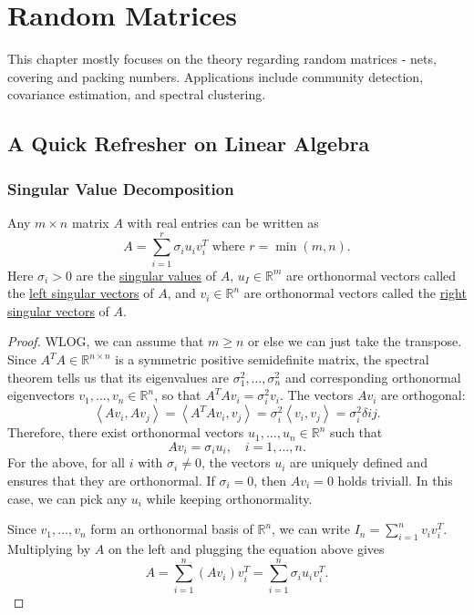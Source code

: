 \section{Random Matrices}

This chapter mostly focuses on the theory regarding random matrices - nets, covering and packing numbers. 
Applications include community detection, covariance estimation, and spectral clustering.



\subsection{A Quick Refresher on Linear Algebra}

\subsubsection{Singular Value Decomposition}
\begin{theorem}[SVD]
\label{thm:4.1.1}
Any $m \times n$ matrix $A$ with real entries can be written as 
\[ A = \sum_{i = 1}^{r} \sigma_i u_i v_i^T \text{ where } r = \min_{}(m, n). \]
Here $\sigma_i > 0$ are the \underline{singular values} of $A$, $u_I \in \mathbb{R}^m$ are orthonormal vectors 
called the \underline{left singular vectors} of $A$, and $v_i \in \mathbb{R}^n$ are orthonormal vectors called 
the \underline{right singular vectors} of $A$.
\end{theorem}

\begin{proof}
WLOG, we can assume that $m \geq n$ or else we can just take the transpose. Since $A^T A \in \mathbb{R}^
{n \times n}$ is a symmetric positive semidefinite matrix, the spectral theorem tells us that its eigenvalues 
are $\sigma_1^2, \dots, \sigma_n^2$ and corresponding orthonormal eigenvectors $v_1, \dots, v_n \in 
\mathbb{R}^n$, so that $A^T A v_i = \sigma_i^2 v_i$. The vectors $Av_i$ are orthogonal: 
\[ \left\langle Av_i, Av_j \right\rangle = \left\langle A^TA v_i, v_j \right\rangle 
= \sigma_i^2 \left\langle v_i, v_j \right\rangle = \sigma_i^2 \delta{ij}. \]
Therefore, there exist orthonormal vectors $u_1, \dots, u_n \in \mathbb{R}^n$ such that 
\[ Av_i = \sigma_i u_i, \quad i = 1, \dots, n. \]
For the above, for all $i$ with $\sigma_i \neq 0$, the vectors $u_i$ are uniquely defined and ensures that 
they are orthonormal. If $\sigma_i = 0$, then $Av_i = 0$ holds triviall. In this case, we can pick any $u_i$ 
while keeping orthonormality.

Since $v_1, \dots, v_n$ form an orthonormal basis of $\mathbb{R}^n$, we can write $I_n = \sum_{i = 1}^{n} 
v_i v_i^T$. Multiplying by $A$ on the left and plugging the equation above gives 
\[ A = \sum_{i = 1}^{n} (Av_i)v_i^T = \sum_{i = 1}^{n} \sigma_i u_i v_i^T. \]
\end{proof}

